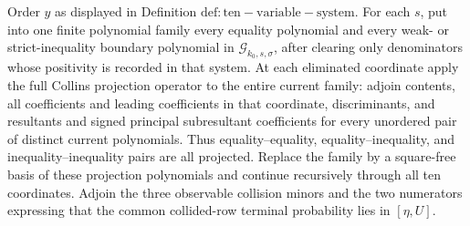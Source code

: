 Order \(y\) as displayed in Definition \(\mathrm{def:ten-variable-system}\).  For each \(s\), put into one finite polynomial family every equality polynomial and every weak- or strict-inequality boundary polynomial in \(\mathscr G_{k_0,s,\sigma}\), after clearing only denominators whose positivity is recorded in that system.  At each eliminated coordinate apply the full Collins projection operator to the entire current family: adjoin contents, all coefficients and leading coefficients in that coordinate, discriminants, and resultants and signed principal subresultant coefficients for every unordered pair of distinct current polynomials.  Thus equality--equality, equality--inequality, and inequality--inequality pairs are all projected.  Replace the family by a square-free basis of these projection polynomials and continue recursively through all ten coordinates.  Adjoin the three observable collision minors and the two numerators expressing that the common collided-row terminal probability lies in \([\eta,U]\).


